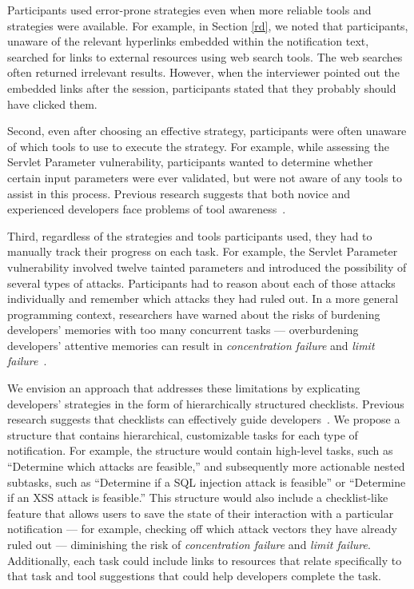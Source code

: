 \documentclass[10pt,journal,compsoc]{IEEEtran}
\begin{document}
Participants used error-prone strategies even when more reliable tools and strategies were available. 
For example, in Section \ref{rd}, we noted that participants, unaware of the relevant hyperlinks embedded within the notification text, searched for links to external resources using web search tools. 
The web searches often returned irrelevant results. 
However, when the interviewer pointed out the embedded links after the session, participants stated that they probably should have clicked them. 

Second, even after choosing an effective strategy, participants were often unaware of which tools to use to execute the strategy.
For example, while assessing the Servlet Parameter vulnerability, participants wanted to determine whether certain input parameters were ever validated, but were not aware of any tools to assist in this process.
Previous research suggests that both novice and experienced developers face problems of tool awareness~\cite{murphy-Hill2012fluency}.

Third, regardless of the strategies and tools participants used, they had to manually track their progress on each task.
For example, the Servlet Parameter vulnerability involved twelve tainted parameters and introduced the possibility of several types of attacks. 
Participants had to reason about each of those attacks individually and remember which attacks they had ruled out.
In a more general programming context, researchers have warned about the risks of burdening developers' memories with too many concurrent tasks 
--- overburdening developers' attentive memories can result in \emph{concentration failure} and \emph{limit failure}~\cite{parnin2012programmer}.

We envision an approach that addresses these limitations by explicating developers' strategies in the form of hierarchically structured checklists.
Previous research suggests that checklists can effectively guide developers~\cite{phang2009triaging}.
We propose a structure that contains hierarchical, customizable tasks for each type of notification.
For example, the structure would contain high-level tasks, such as ``Determine which attacks are feasible,'' and subsequently more actionable nested subtasks, such as ``Determine if a SQL injection attack is feasible'' or ``Determine if an XSS attack is feasible.''
This structure would also include a checklist-like feature that allows users to save the state of their interaction with a particular notification --- for example, checking off which attack vectors they have already ruled out --- diminishing the risk of \emph{concentration failure} and \emph{limit failure}.
Additionally, each task could include links to resources that relate specifically to that task and tool suggestions that could help developers complete the task.
\end{document}
